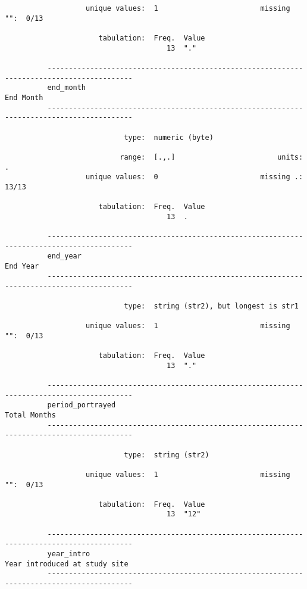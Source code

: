 \documentclass{article}
\begin{document}
\begin{verbatim}
                   unique values:  1                        missing "":  0/13
          
                      tabulation:  Freq.  Value
                                      13  "."
          
          ------------------------------------------------------------------------------------------
          end_month                                                                        End Month
          ------------------------------------------------------------------------------------------
          
                            type:  numeric (byte)
          
                           range:  [.,.]                        units:  .
                   unique values:  0                        missing .:  13/13
          
                      tabulation:  Freq.  Value
                                      13  .
          
          ------------------------------------------------------------------------------------------
          end_year                                                                          End Year
          ------------------------------------------------------------------------------------------
          
                            type:  string (str2), but longest is str1
          
                   unique values:  1                        missing "":  0/13
          
                      tabulation:  Freq.  Value
                                      13  "."
          
          ------------------------------------------------------------------------------------------
          period_portrayed                                                              Total Months
          ------------------------------------------------------------------------------------------
          
                            type:  string (str2)
          
                   unique values:  1                        missing "":  0/13
          
                      tabulation:  Freq.  Value
                                      13  "12"
          
          ------------------------------------------------------------------------------------------
          year_intro                                                   Year introduced at study site
          ------------------------------------------------------------------------------------------
          

\end{verbatim}
\end{document}
